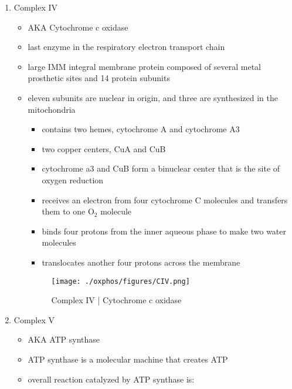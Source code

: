 \documentclass{scrartcl}
\begin{document}
\begin{enumerate}
\begin{itemize}
{\small{}}
\end{itemize}

\item Complex IV
\label{sec:orgcffb736}
\begin{itemize}
\item AKA Cytochrome c oxidase
\item last enzyme in the respiratory electron transport chain
\item large IMM integral membrane protein composed of several metal prosthetic sites and 14 protein subunits
\item eleven subunits are nuclear in origin, and three are synthesized in the mitochondria
\begin{itemize}
\item contains two hemes, cytochrome A and cytochrome A3
\item two copper centers, CuA and CuB
\item cytochrome a3 and CuB form a binuclear center that is the site of
oxygen reduction
\item receives an electron from four cytochrome C molecules and
transfers them to one O\(_{\text{2}}\) molecule
\end{itemize}

{\small{}}

\begin{itemize}
\item binds four protons from the inner aqueous phase to make two water
molecules
\item translocates another four protons across the membrane
\end{itemize}

\begin{figure}[htbp]
\centering
\texttt{[image: ./oxphos/figures/CIV.png]}
\caption[cIV]{\label{fig:org8af08fa}
Complex IV | Cytochrome c oxidase}
\end{figure}
\end{itemize}

\item Complex V
\label{sec:org8589941}
\begin{itemize}
\item AKA ATP synthase
\item ATP synthase is a molecular machine that creates ATP
\item overall reaction catalyzed by ATP synthase is:
\end{itemize}


\end{enumerate}
\end{document}
